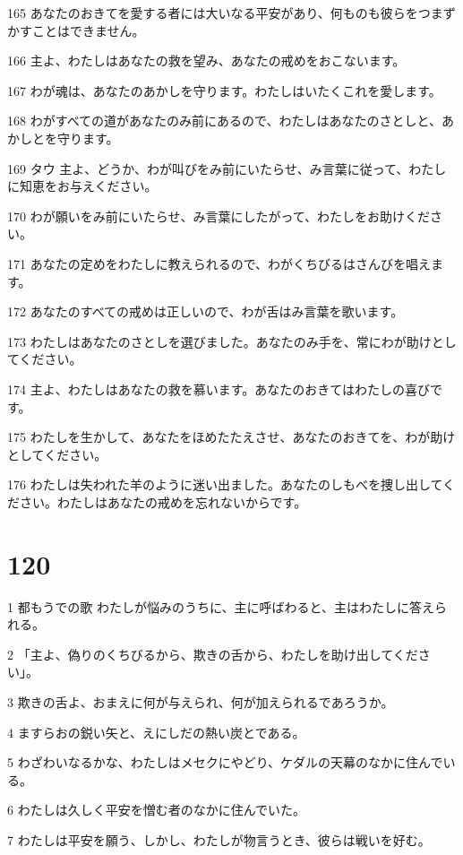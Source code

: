 \par 165 あなたのおきてを愛する者には大いなる平安があり、何ものも彼らをつまずかすことはできません。
\par 166 主よ、わたしはあなたの救を望み、あなたの戒めをおこないます。
\par 167 わが魂は、あなたのあかしを守ります。わたしはいたくこれを愛します。
\par 168 わがすべての道があなたのみ前にあるので、わたしはあなたのさとしと、あかしとを守ります。
\par 169 タウ 主よ、どうか、わが叫びをみ前にいたらせ、み言葉に従って、わたしに知恵をお与えください。
\par 170 わが願いをみ前にいたらせ、み言葉にしたがって、わたしをお助けください。
\par 171 あなたの定めをわたしに教えられるので、わがくちびるはさんびを唱えます。
\par 172 あなたのすべての戒めは正しいので、わが舌はみ言葉を歌います。
\par 173 わたしはあなたのさとしを選びました。あなたのみ手を、常にわが助けとしてください。
\par 174 主よ、わたしはあなたの救を慕います。あなたのおきてはわたしの喜びです。
\par 175 わたしを生かして、あなたをほめたたえさせ、あなたのおきてを、わが助けとしてください。
\par 176 わたしは失われた羊のように迷い出ました。あなたのしもべを捜し出してください。わたしはあなたの戒めを忘れないからです。

\chapter{120}

\par 1 都もうでの歌 わたしが悩みのうちに、主に呼ばわると、主はわたしに答えられる。
\par 2 「主よ、偽りのくちびるから、欺きの舌から、わたしを助け出してください」。
\par 3 欺きの舌よ、おまえに何が与えられ、何が加えられるであろうか。
\par 4 ますらおの鋭い矢と、えにしだの熱い炭とである。
\par 5 わざわいなるかな、わたしはメセクにやどり、ケダルの天幕のなかに住んでいる。
\par 6 わたしは久しく平安を憎む者のなかに住んでいた。
\par 7 わたしは平安を願う、しかし、わたしが物言うとき、彼らは戦いを好む。

